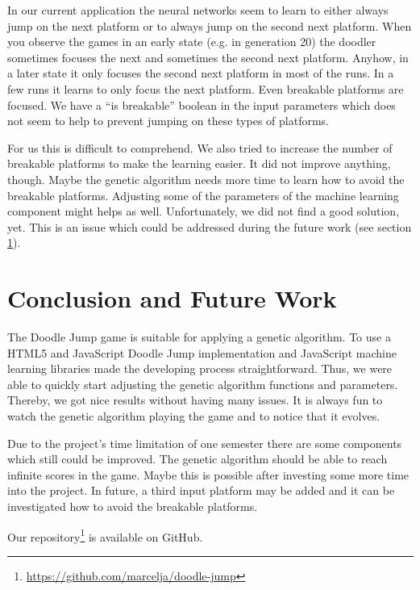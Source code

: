 \documentclass[a4paper,12pt,pagesize,headsepline,bibtotoc,titlepage,abstracton]{scrartcl}
\begin{document}
In our current application the neural networks seem to learn to either always jump on the next platform or to always jump on the second next platform. When you observe the games in an early state (e.g. in generation 20) the doodler sometimes focuses the next and sometimes the second next platform. Anyhow, in a later state it only focuses the second next platform in most of the runs. In a few runs it learns to only focus the next platform. Even breakable platforms are focused. We have a ``is breakable'' boolean in the input parameters which does not seem to help to prevent jumping on these types of platforms.

For us this is difficult to comprehend. We also tried to increase the number of breakable platforms to make the learning easier. It did not improve anything, though. Maybe the genetic algorithm needs more time to learn how to avoid the breakable platforms. Adjusting some of the parameters of the machine learning component might helps as well. Unfortunately, we did not find a good solution, yet. This is an issue which could be addressed during the future work (see section \ref{sec:cafw}).

\section{Conclusion and Future Work}
\label{sec:cafw}

The Doodle Jump game is suitable for applying a genetic algorithm. To use a HTML5 and JavaScript Doodle Jump implementation and JavaScript machine learning libraries made the developing process straightforward. Thus, we were able to quickly start adjusting the genetic algorithm functions and parameters. Thereby, we got nice results without having many issues. It is always fun to watch the genetic algorithm playing the game and to notice that it evolves.

Due to the project's time limitation of one semester there are some components which still could be improved. The genetic algorithm should be able to reach infinite scores in the game. Maybe this is possible after investing some more time into the project. In future, a third input platform may be added and it can be investigated how to avoid the breakable platforms.

Our repository\footnote{\url{https://github.com/marcelja/doodle-jump}} is available on GitHub.

\newpage

 
\end{document}
